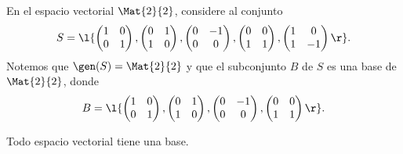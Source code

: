 \documentclass[compacto,10pt]{pubciencias-notas}
\begin{document}
\begin{ejem}\hspace{0pt}
En el espacio vectorial $\Mat{2}{2}$, considere al conjunto 
\[
    S = \l\{\begin{pmatrix}1&0\\0&1\end{pmatrix}, 
            \begin{pmatrix}0&1\\1&0\end{pmatrix},
            \begin{pmatrix}0&- 1\\0&0\end{pmatrix},
            \begin{pmatrix}0&0\\1&1\end{pmatrix},
            \begin{pmatrix}1&0\\1&- 1\end{pmatrix}\r\}.
\]
Notemos que $\gen(S) = \Mat{2}{2}$ y que el subconjunto $B$ de $S$ es una base de $\Mat{2}{2}$, donde
\[
    B = \l\{\begin{pmatrix}1&0\\0&1\end{pmatrix}, 
            \begin{pmatrix}0&1\\1&0\end{pmatrix},
            \begin{pmatrix}0&- 1\\0&0\end{pmatrix},
            \begin{pmatrix}0&0\\1&1\end{pmatrix}\r\}.
\]
\end{ejem}


\begin{teo}
Todo espacio vectorial tiene una base.
\end{teo}
\end{document}
